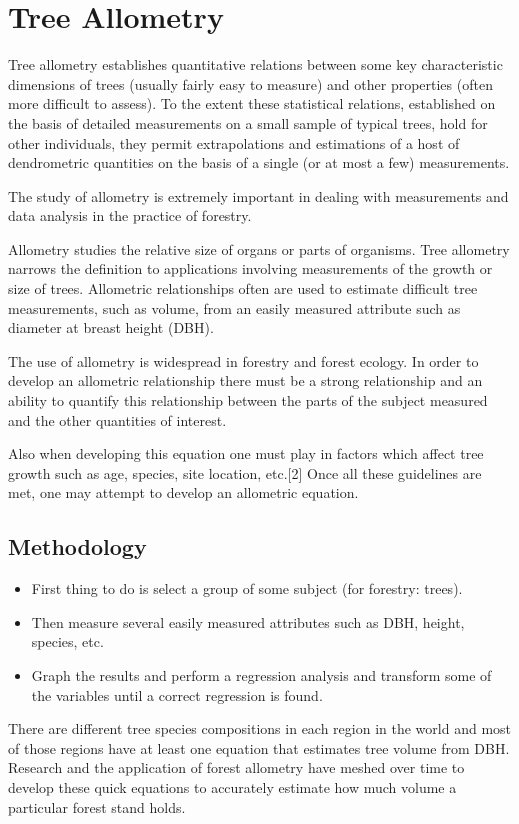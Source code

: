 \section{Tree Allometry}

Tree allometry establishes quantitative relations between some key characteristic dimensions of trees (usually fairly easy to measure) and other properties (often more difficult to assess). To the extent these statistical relations, established on the basis of detailed measurements on a small sample of typical trees, hold for other individuals, they permit extrapolations and estimations of a host of dendrometric quantities on the basis of a single (or at most a few) measurements.

The study of allometry is extremely important in dealing with measurements and data analysis in the practice of forestry. 

Allometry studies the relative size of organs or parts of organisms. Tree allometry narrows the definition to applications involving measurements of the growth or size of trees. Allometric relationships often are used to estimate difficult tree measurements, such as volume, from an easily measured attribute such as diameter at breast height (DBH).

The use of allometry is widespread in forestry and forest ecology. In order to develop an allometric relationship there must be a strong relationship and an ability to quantify this relationship between the parts of the subject measured and the other quantities of interest.

Also when developing this equation one must play in factors which affect tree growth such as age, species, site location, etc.[2] Once all these guidelines are met, one may attempt to develop an allometric equation. 

\subsection*{Methodology}
\begin{itemize}
\item First thing to do is select a group of some subject (for forestry: trees). 
\item Then measure several easily measured attributes such as DBH, height, species, etc. 
\item Graph the results and perform a regression analysis and transform some of the variables until a correct regression is found.
\end{itemize}
There are different tree species compositions in each region in the world and most of those regions have at least one equation that estimates tree volume from DBH. Research and the application of forest allometry have meshed over time to develop these quick equations to accurately estimate how much volume a particular forest stand holds.

